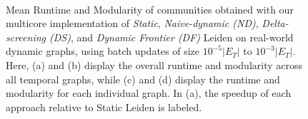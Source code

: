 \begin{figure}[!hbt]
  \centering
   \\[-2ex]
  \caption{Mean Runtime and Modularity of communities obtained with our multicore implementation of \textit{Static}, \textit{Naive-dynamic (ND)}, \textit{Delta-screening (DS)}, and \textit{Dynamic Frontier (DF)} Leiden on real-world dynamic graphs, using batch updates of size $10^{-5}|E_T|$ to $10^{-3}|E_T|$. Here, (a) and (b) display the overall runtime and modularity across all temporal graphs, while (c) and (d) display the runtime and modularity for each individual graph. In (a), the speedup of each approach relative to Static Leiden is labeled.}
  \label{fig:optimize-subrefine}
\end{figure}
